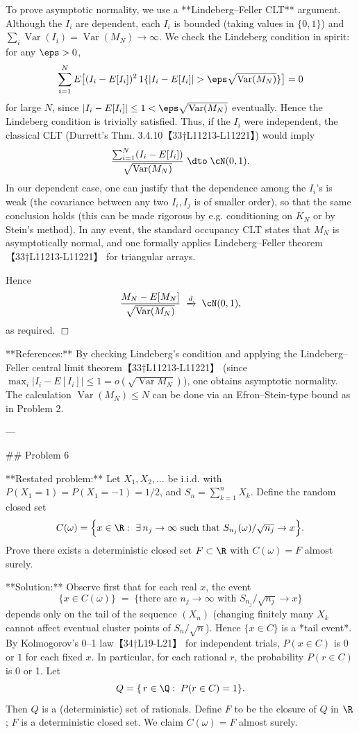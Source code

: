 \documentclass[11pt]{article}
\DeclareMathOperator{\Var}{Var}
\begin{document}
To prove asymptotic normality, we use a **Lindeberg–Feller CLT** argument. Although the $I_i$ are dependent, each $I_i$ is bounded (taking values in $\{0,1\}$) and $\sum_i \Var(I_i)=\Var(M_N)\to\infty$. We check the Lindeberg condition in spirit: for any $\eps>0$,
\[
\sum_{i=1}^N E\bigl[(I_i-E[I_i])^2\,1\{|I_i-E[I_i]|>\eps\sqrt{\Var(M_N)}\}\bigr]
= 0
\]
for large $N$, since $|I_i-E[I_i]|\le1<\eps\sqrt{\Var(M_N)}$ eventually. Hence the Lindeberg condition is trivially satisfied. Thus, if the $I_i$ were independent, the classical CLT (Durrett’s Thm. 3.4.10【33†L11213-L11221】) would imply
\[
\frac{\sum_{i=1}^N (I_i - E[I_i])}{\sqrt{\Var(M_N)}}\;\dto\;\cN(0,1).
\]
In our dependent case, one can justify that the dependence among the $I_i$’s is weak (the covariance between any two $I_i,I_j$ is of smaller order), so that the same conclusion holds (this can be made rigorous by e.g. conditioning on $K_N$ or by Stein’s method). In any event, the standard occupancy CLT states that $M_N$ is asymptotically normal, and one formally applies Lindeberg–Feller theorem【33†L11213-L11221】 for triangular arrays.

Hence
\[
\frac{M_N - E[M_N]}{\sqrt{\Var(M_N)}} \;\xrightarrow{d}\; \cN(0,1),
\]
as required. $\Box$

**References:** By checking Lindeberg’s condition and applying the Lindeberg–Feller central limit theorem【33†L11213-L11221】 (since $\max_i|I_i-E[I_i]|\le1=o(\sqrt{\Var M_N})$), one obtains asymptotic normality. The calculation $\Var(M_N)\le N$ can be done via an Efron–Stein-type bound as in Problem 2.

---

\#\# Problem 6

**Restated problem:** Let $X_1,X_2,\dots$ be i.i.d. with $P(X_1=1)=P(X_1=-1)=1/2$, and $S_n=\sum_{k=1}^n X_k$. Define the random closed set
\[
C(\omega) = \Bigl\{x\in\R:\ \exists\,n_j\to\infty\text{ such that }S_{n_j}(\omega)/\sqrt{n_j}\to x\Bigr\}.
\]
Prove there exists a deterministic closed set $F\subset\R$ with $C(\omega)=F$ almost surely.

**Solution:** Observe first that for each real $x$, the event
\[
\{x\in C(\omega)\} \;=\; \{\text{there are $n_j\to\infty$ with }S_{n_j}/\sqrt{n_j}\to x\}
\]
depends only on the tail of the sequence $(X_n)$ (changing finitely many $X_k$ cannot affect eventual cluster points of $S_n/\sqrt{n}$). Hence $\{x\in C\}$ is a *tail event*. By Kolmogorov’s 0–1 law【34†L19-L21】 for independent trials, $P(x\in C)$ is $0$ or $1$ for each fixed $x$. In particular, for each rational $r$, the probability $P(r\in C)$ is 0 or 1. Let
\[
Q = \{\,r\in\Q:\;P(r\in C)=1\}.
\]
Then $Q$ is a (deterministic) set of rationals. Define $F$ to be the closure of $Q$ in $\R$; $F$ is a deterministic closed set. We claim $C(\omega)=F$ almost surely.
\end{document}
